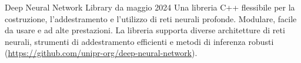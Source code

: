 
\begin{cventries}
	\cventrytool
		{Deep Neural Network Library}
		{da maggio 2024}
		{
		Una libreria C++ flessibile per la costruzione, l'addestramento e l'utilizzo di reti neurali profonde. Modulare, facile da usare e ad alte prestazioni. La libreria supporta diverse architetture di reti neurali, strumenti di addestramento efficienti e metodi di inferenza robusti (\url{https://github.com/unipr-org/deep-neural-network}).	
		}
\end{cventries}
